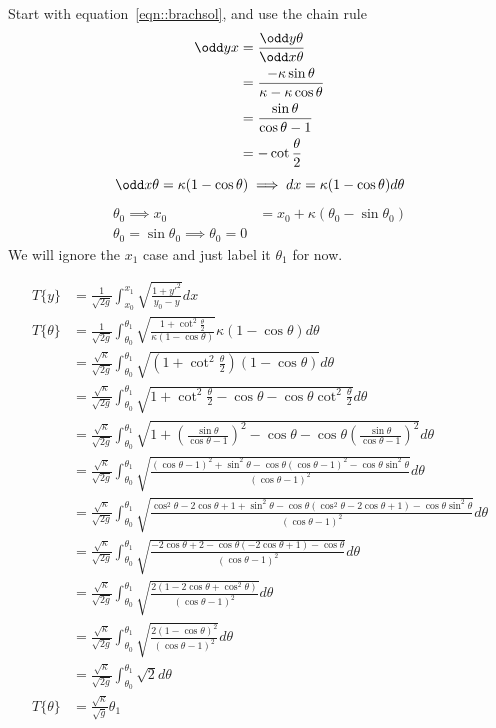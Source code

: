 \documentclass{X:/Documents/Coding/Latex/myassignment}
\begin{document}
\begin{enumerate}
\begin{enumerate}
	Start with equation~\ref{eqn::brachsol}, and use the chain rule
	\begin{align*}
		\odd yx &= \frac{\odd y\theta}{\odd x\theta}\\
		&=	\frac{-\kappa\sin\theta}{\kappa - \kappa\cos\theta}\\
		&= \frac{\sin\theta}{\cos\theta -1}\\
		&= - \cot \frac{\theta}{2}
	\end{align*}
	\[\odd x\theta = \kappa (1-\cos\theta) \implies dx =\kappa (1-\cos\theta) d\theta\]
	\begin{align*}
		\theta_0 \implies x_0 &= x_0 + \kappa(\theta_0 - \sin\theta_0)\\
		\theta_0 = \sin\theta_0 \implies \theta_0 = 0
	\end{align*}
	We will ignore the $x_1$ case and just label it $\theta_1$ for now.

	\begin{align*}
		T\{y\} &= \frac{1}{\sqrt{2g}} \int_{x_0}^{x_1} \sqrt{\frac{1 + y'^2}{y_0 -y}} dx\\	
	 T\{\theta\}&= \frac{1}{\sqrt{2g}} \int_{\theta_0}^{\theta_1} \sqrt{\frac{1 + \cot^2\frac{\theta}{2}}{\kappa(1-\cos\theta)}} \kappa (1-\cos\theta) d\theta\\
	 &= \frac{\sqrt{\kappa}}{\sqrt{2g}} \int_{\theta_0}^{\theta_1} \sqrt{\left(1 + \cot^2\frac{\theta}{2}\right)(1-\cos\theta)} d\theta\\
	 &= \frac{\sqrt{\kappa}}{\sqrt{2g}} \int_{\theta_0}^{\theta_1} \sqrt{1 + \cot^2\frac{\theta}{2} - \cos\theta -\cos\theta \cot^2\frac{\theta}{2}} d\theta\\
	 &= \frac{\sqrt{\kappa}}{\sqrt{2g}} \int_{\theta_0}^{\theta_1} \sqrt{1 + \left(\frac{\sin\theta}{\cos\theta -1}\right)^2 - \cos\theta -\cos\theta \left(\frac{\sin\theta}{\cos\theta -1}\right)^2} d\theta\\
	 &= \frac{\sqrt{\kappa}}{\sqrt{2g}} \int_{\theta_0}^{\theta_1} \sqrt{\frac{(\cos\theta - 1)^2 + \sin^2\theta - \cos\theta (\cos\theta - 1)^2 - \cos\theta \sin^2\theta}{(\cos\theta - 1)^2}} d\theta\\
	 &= \frac{\sqrt{\kappa}}{\sqrt{2g}} \int_{\theta_0}^{\theta_1} \sqrt{\frac{\cos^2\theta -2\cos\theta + 1 + \sin^2\theta - \cos\theta (\cos^2\theta -2\cos\theta + 1) - \cos\theta \sin^2\theta}{(\cos\theta - 1)^2}} d\theta\\
	 &= \frac{\sqrt{\kappa}}{\sqrt{2g}} \int_{\theta_0}^{\theta_1} \sqrt{\frac{ -2\cos\theta + 2 - \cos\theta (-2\cos\theta + 1) - \cos\theta}{(\cos\theta - 1)^2}} d\theta\\
	 &= \frac{\sqrt{\kappa}}{\sqrt{2g}} \int_{\theta_0}^{\theta_1} \sqrt{\frac{2(1 -2\cos\theta + \cos^2\theta) }{(\cos\theta - 1)^2}} d\theta\\
	 &= \frac{\sqrt{\kappa}}{\sqrt{2g}} \int_{\theta_0}^{\theta_1} \sqrt{\frac{2(1-\cos\theta)^2 }{(\cos\theta - 1)^2}} d\theta\\
	 &= \frac{\sqrt{\kappa}}{\sqrt{2g}} \int_{\theta_0}^{\theta_1} \sqrt{2}d\theta\\
	T\{\theta\} &= \frac{\sqrt{\kappa}}{\sqrt{g}} \theta_1\\
	\end{align*}



\end{enumerate}
\end{enumerate}
\end{document}
